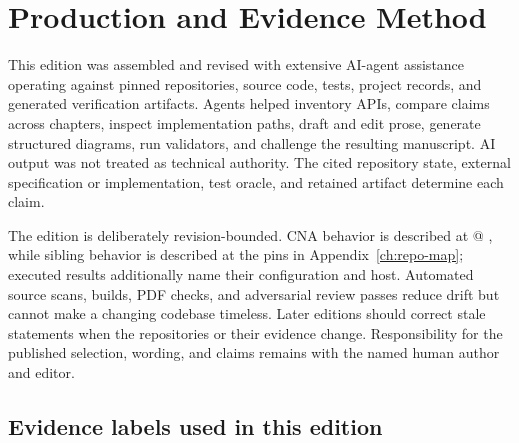 \chapter*{Production and Evidence Method}

This edition was assembled and revised with extensive AI-agent assistance operating against
pinned repositories, source code, tests, project records, and generated verification artifacts.
Agents helped inventory APIs, compare claims across chapters, inspect implementation paths,
draft and edit prose, generate structured diagrams, run validators, and challenge the resulting
manuscript. AI output was not treated as technical authority. The cited repository state,
external specification or implementation, test oracle, and retained artifact determine each
claim.

The edition is deliberately revision-bounded. CNA behavior is described at \CnaEditionTag{} @
\CnaRevision, while sibling behavior is described at the pins in
Appendix~\ref{ch:repo-map}; executed results additionally name their configuration and host.
Automated source scans, builds, PDF checks, and adversarial review passes reduce drift but cannot
make a changing codebase timeless. Later editions should correct stale statements when the
repositories or their evidence change. Responsibility for the published selection, wording, and
claims remains with the named human author and editor.

\section*{Evidence labels used in this edition}

